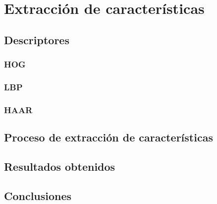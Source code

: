 
\chapter{Extracción de características}
\label{cap:caract}


\section{Descriptores}
\label{caract:descriptores}


\subsection{HOG}
\label{descriptores:hog}

\subsection{LBP}
\label{descriptores:lbp}

\subsection{HAAR}
\label{descriptores:haar}


\section{Proceso de extracción de características}
\label{caract:extraccion}

\section{Resultados obtenidos}
\label{caract:resultados}

\section{Conclusiones}
\label{caract:conclusiones}